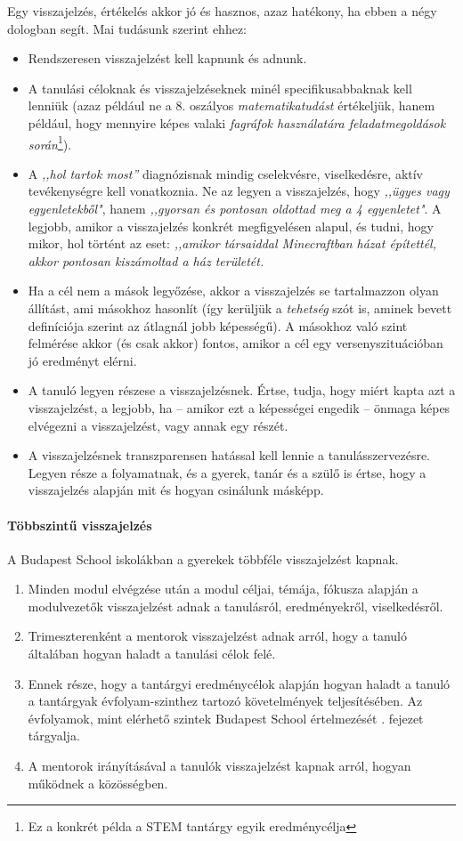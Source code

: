 Egy visszajelzés, értékelés akkor jó és hasznos, azaz hatékony, ha ebben a négy dologban segít. Mai tudásunk szerint ehhez:
\begin{itemize}
\item Rendszeresen visszajelzést kell kapnunk és adnunk.
\item A tanulási céloknak és visszajelzéseknek minél specifikusabbaknak kell lenniük (azaz például ne a 8. oszályos \emph{matematikatudást} értékeljük, hanem például, hogy mennyire képes valaki \emph{fagráfok használatára feladatmegoldások során}\footnote{Ez a konkrét példa a STEM tantárgy egyik eredménycélja}).
\item A \emph{,,hol tartok most''} diagnózisnak mindig cselekvésre, viselkedésre, aktív tevékenységre kell vonatkoznia. Ne az legyen a visszajelzés, hogy \emph{,,ügyes vagy egyenletekből"}, hanem \emph{,,gyorsan és pontosan oldottad meg a 4 egyenletet"}. A legjobb, amikor a visszajelzés konkrét megfigyelésen alapul, és tudni, hogy mikor, hol történt az eset: \emph{,,amikor társaiddal Minecraftban házat építettél, akkor pontosan kiszámoltad a ház területét.}
\item Ha a cél nem a mások legyőzése, akkor a visszajelzés se tartalmazzon olyan állítást, ami másokhoz hasonlít (így kerüljük a \emph{tehetség} szót is, aminek bevett definíciója szerint az átlagnál jobb képességű). A másokhoz való szint felmérése akkor (és csak akkor) fontos, amikor a cél egy versenyszituációban jó eredményt elérni.

\item A tanuló legyen részese a visszajelzésnek. Értse, tudja, hogy miért kapta azt a visszajelzést, a legjobb, ha -- amikor ezt a képességei engedik -- önmaga képes elvégezni a visszajelzést, vagy annak egy részét.
\item A visszajelzésnek transzparensen hatással kell lennie a tanulásszervezésre. Legyen része a folyamatnak, és a gyerek, tanár és a szülő is értse, hogy a visszajelzés alapján mit és hogyan csinálunk másképp.
\end{itemize}

\paragraph{Többszintű visszajelzés} A Budapest School iskolákban a gyerekek többféle visszajelzést kapnak. \begin{enumerate}
\item Minden modul elvégzése után a modul céljai, témája, fókusza alapján a modulvezetők visszajelzést adnak a tanulásról, eredményekről, viselkedésről.
\item Trimeszterenként a mentorok visszajelzést adnak arról, hogy a tanuló általában hogyan haladt a tanulási célok felé.
\item Ennek része, hogy a tantárgyi eredménycélok alapján hogyan haladt a tanuló a tantárgyak évfolyam-szinthez tartozó követelmények teljesítésében. Az évfolyamok, mint elérhető szintek Budapest School értelmezését . fejezet tárgyalja.
\item A mentorok irányításával a tanulók visszajelzést kapnak arról, hogyan működnek a közösségben.
\end{enumerate}

